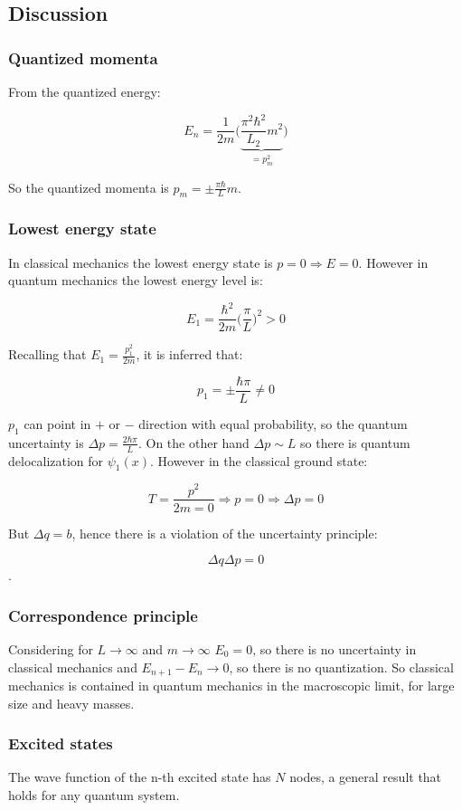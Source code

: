   \subsection{Discussion}

    \subsubsection{Quantized momenta}
    From the quantized energy:

    $$E_n = \frac{1}{2m}\biggl(\underbrace{\frac{\pi^2\hbar^2}{L_2}m^2}_{=p_m^2}\biggr)$$

    So the quantized momenta is $p_m = \pm \frac{\pi\hbar}{L}m$.

    \subsubsection{Lowest energy state}
    In classical mechanics the lowest energy state is $p = 0\Rightarrow E = 0$.
    However in quantum mechanics the lowest energy level is:

    $$E_1 = \frac{\hbar^2}{2m}\biggl(\frac{\pi}{L}\biggr)^2 > 0$$

    Recalling that $E_1 = \frac{p_1^2}{2m}$, it is inferred that:

    $$p_1 = \pm \frac{\hbar\pi}{L}\neq 0$$

    $p_1$ can point in $+$ or $-$ direction with equal probability, so the quantum uncertainty is $\Delta p =\frac{2\hbar\pi}{L}$.
    On the other hand $\Delta p \sim L$ so there is quantum delocalization for $\psi_1(x)$.
    However in the classical ground state:

    $$T = \frac{p^2}{2m = 0}\Rightarrow p = 0\Rightarrow \Delta p = 0$$

    But $\Delta q = b$, hence there is a violation of the uncertainty principle:

    $$\Delta q\Delta p = 0$$.

    \subsubsection{Correspondence principle}
    Considering for $L\rightarrow\infty$ and $m\rightarrow\infty$ $E_0 = 0$, so there is no uncertainty in classical mechanics and $E_{n+1}-E_n \rightarrow 0$, so there is no quantization.
    So classical mechanics is contained in quantum mechanics in the macroscopic limit, for large size and heavy masses.

    \subsubsection{Excited states}
    The wave function of the n-th excited state has $N$ nodes, a general result that holds for any quantum system.

